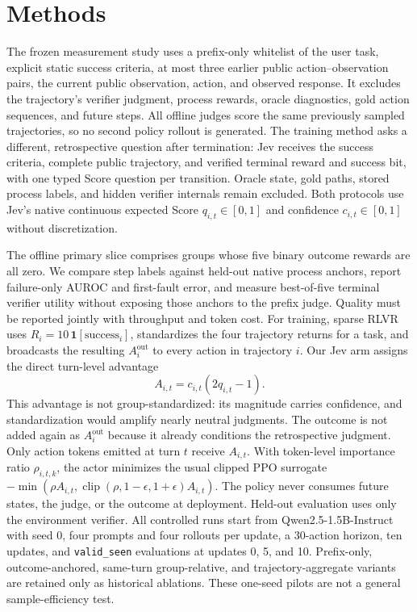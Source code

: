 \documentclass{article}
\begin{document}
\section{Methods}

The frozen measurement study uses a prefix-only whitelist of the user task, explicit static success criteria, at most three earlier public action--observation pairs, the current public observation, action, and observed response. It excludes the trajectory's verifier judgment, process rewards, oracle diagnostics, gold action sequences, and future steps. All offline judges score the same previously sampled trajectories, so no second policy rollout is generated. The training method asks a different, retrospective question after termination: Jev receives the success criteria, complete public trajectory, and verified terminal reward and success bit, with one typed Score question per transition. Oracle state, gold paths, stored process labels, and hidden verifier internals remain excluded. Both protocols use Jev's native continuous expected Score $q_{i,t}\in[0,1]$ and confidence $c_{i,t}\in[0,1]$ without discretization.

The offline primary slice comprises groups whose five binary outcome rewards are all zero. We compare step labels against held-out native process anchors, report failure-only AUROC and first-fault error, and measure best-of-five terminal verifier utility without exposing those anchors to the prefix judge. Quality must be reported jointly with throughput and token cost. For training, sparse RLVR uses $R_i=10\,\mathbf{1}[\mathrm{success}_i]$, standardizes the four trajectory returns for a task, and broadcasts the resulting $A_i^{\mathrm{out}}$ to every action in trajectory $i$. Our Jev arm assigns the direct turn-level advantage
\begin{equation}
A_{i,t}=c_{i,t}(2q_{i,t}-1).
\end{equation}
This advantage is not group-standardized: its magnitude carries confidence, and standardization would amplify nearly neutral judgments. The outcome is not added again as $A_i^{\mathrm{out}}$ because it already conditions the retrospective judgment. Only action tokens emitted at turn $t$ receive $A_{i,t}$. With token-level importance ratio $\rho_{i,t,k}$, the actor minimizes the usual clipped PPO surrogate $-\min(\rho A_{i,t},\operatorname{clip}(\rho,1-\epsilon,1+\epsilon)A_{i,t})$. The policy never consumes future states, the judge, or the outcome at deployment. Held-out evaluation uses only the environment verifier. All controlled runs start from Qwen2.5-1.5B-Instruct with seed 0, four prompts and four rollouts per update, a 30-action horizon, ten updates, and \texttt{valid\_seen} evaluations at updates 0, 5, and 10. Prefix-only, outcome-anchored, same-turn group-relative, and trajectory-aggregate variants are retained only as historical ablations. These one-seed pilots are not a general sample-efficiency test.
\end{document}
